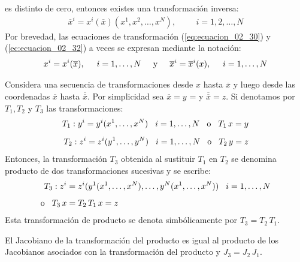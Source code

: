 es distinto de cero, entonces existes una transformación inversa:
\begin{align}
\overline{x}^{i} = x^{i} (\overline{x}) (x^{1}, x^{2}, \ldots, x^{N}), \hspace{1cm} i = 1, 2, \ldots, N
\label{ec:ecuacion_02_32}
\end{align}
Por brevedad, las ecuaciones de transformación (\ref{eq:ecuacion_02_30}) y (\ref{ec:ecuacion_02_32}) a veces se expresan mediante la notación:
\begin{align}
x^{i} = x^{i} (\overline{x}), \hspace{0.5cm} i = 1, \ldots, N \hspace{0.5cm} \mbox{y} \hspace{0.5cm} \overline{x}^{i} = \overline{x}^{i} (x), \hspace{0.5cm} i =1, \ldots, N
\label{eq:ecuacion_02_33}
\end{align}

Considera una secuencia de transformaciones desde $x$ hasta $\overline{x}$ y luego desde las coordenadas $\overline{x}$ hasta $\overline{\overline{x}}$. Por simplicidad sea $\overline{x} = y$ = y $\overline{\overline{x}} = z$. Si denotamos por $T_{1}, T_{2}$ y $T_{3}$ las transformaciones:
\begin{align*}
T_{1}: y^{i} = y^{i} (x^{1}, \ldots, x^{N}) \hspace{0.3cm} i = 1, \ldots, N \hspace{0.3cm} \mbox{o} \hspace{0.3cm} T_{1} \, x = y \\[0.5em]
T_{2}: z^{i} = z^{i} (y^{1}, \ldots, y^{N}) \hspace{0.3cm} i = 1, \ldots, N \hspace{0.3cm} \mbox{o} \hspace{0.3cm} T_{2} \, y = z
\end{align*}
Entonces, la transformación $T_{3}$ obtenida al sustituir $T_{1}$ en $T_{2}$ se denomina producto de dos transformaciones sucesivas y se escribe:
\begin{align*}
T_{3}: z^{i} &= z^{i} (y^{1} (x^{1}, \ldots, x^{N}), \ldots, y^{N} (x^{1}, \ldots, x^{N})) \hspace{0.3cm} i = 1, \ldots, N \\[0.5em]
\mbox{o} \hspace{0.3cm} T_{3} \, x &= T_{2} \, T_{1} \, x = z
\end{align*}
Esta transformación de producto se denota simbólicamente por $T_{3} = T_{2} \, T_{1}$.
\par
El Jacobiano de la transformación del producto es igual al producto de los Jacobianos asociados con la transformación del producto y $J_{3} = J_{2} \, J_{1}$.

